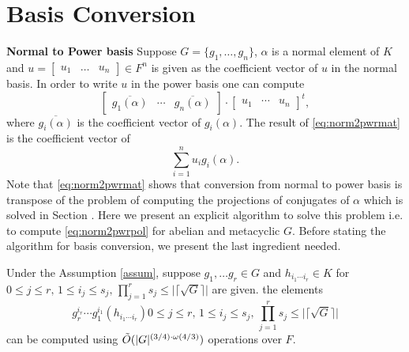 \section{Basis Conversion}

\textbf{Normal to Power basis}
Suppose $G = \lbrace g_1, \ldots, g_n \rbrace$, $\alpha$ is a normal element of $K$ and $u = \begin{bmatrix}u_1 & \ldots & u_n \end{bmatrix} \in F^n$ is given as the coefficient vector of $u$ in the normal basis.
In order to write $u $ in the power basis one can compute 
\begin{equation}\label{eq:norm2pwrmat}
\left[\begin{array}{c|c|c}
\overline{g_1(\alpha)} & \cdots & \overline{g_n(\alpha)} 
\end{array}\right]\cdot 
\begin{bmatrix}
u_1 & \cdots & u_n
\end{bmatrix}^t,
\end{equation}
where $\overline{g_i(\alpha)}$ is the coefficient vector of $g_i(\alpha)$. The result of \eqref{eq:norm2pwrmat} is the coefficient vector of
\begin{equation}\label{eq:norm2pwrpol}
\sum_{i = 1}^n u_i g_i(\alpha).
\end{equation}
Note that \eqref{eq:norm2pwrmat} shows that conversion from normal to power basis is transpose of the problem of computing the projections of 
conjugates of $\alpha$ which is solved in Section \label{sec:osum}. Here we present an explicit algorithm to solve this problem i.e. to compute
\eqref{eq:norm2pwrpol} for abelian and metacyclic $G$. Before stating the algorithm for basis conversion, we present the last
ingredient needed. 

\begin{lemma}\label{lem:hornerrep}
Under the Assumption \ref{assum}, suppose $g_1, \ldots g_r \in G$ and $h_{i_1 \cdots i_r} \in K$ for $0 \leq j \leq r, \, 
1 \leq i_j \leq s_j, \, \prod_{j = 1}^r s_j \leq \vert \lceil \sqrt{G} \rceil \vert$ are given. the elements 
$$g_r^{i_r}\cdots g_1^{i_1}(h_{i_1 \cdots i_r}) 0 \leq j \leq r, \, 
1 \leq i_j \leq s_j, \, \prod_{j = 1}^r s_j \leq \vert \lceil \sqrt{G} \rceil \vert$$
can be computed using $\tilde{O}(\vert G \vert ^{(3/4)\cdot \omega(4/3)})$ operations over $F$.
\end{lemma}

